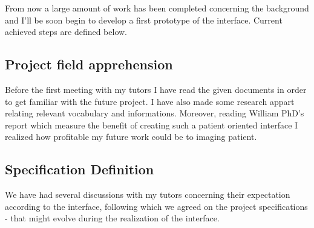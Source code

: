\documentclass[12pt,twoside]{article}
\begin{document}
From now a large amount of work has been completed concerning the background and I'll be soon begin to develop a first prototype of the interface. Current achieved steps are defined below.

\subsection{Project field apprehension}
Before the first meeting with my tutors I have read the given documents in order to get familiar with the future project. I have also made some research appart relating relevant vocabulary and informations.
Moreover, reading William PhD's report which measure the benefit of creating such a patient oriented interface I realized how profitable my future work could be to imaging patient.


\subsection{Specification Definition}
We have had several discussions with my tutors concerning their expectation according to the interface, following which we agreed on the project specifications - that might evolve during the realization of the interface.
\end{document}
